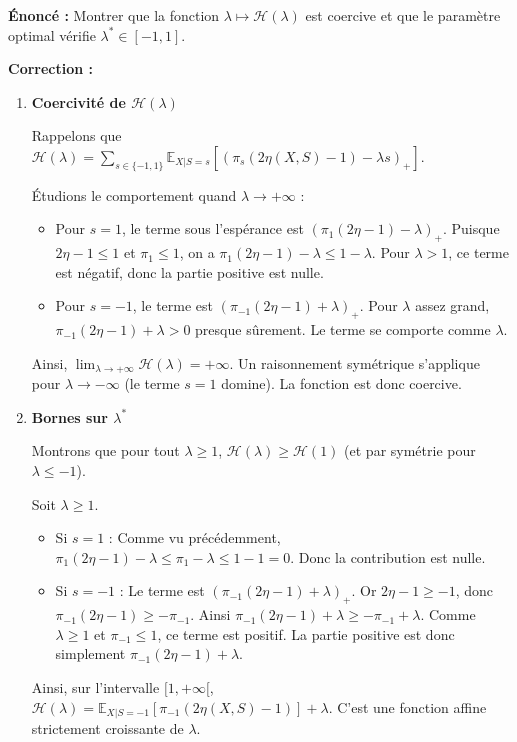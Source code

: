 \begin{exemple}
    \textbf{Énoncé :}
    Montrer que la fonction $\lambda \mapsto \mathcal{H}(\lambda)$ est coercive et que le paramètre optimal vérifie $\lambda^* \in [-1, 1]$.

    \medskip
    \textbf{Correction :}
    \begin{enumerate}
        \item \textbf{Coercivité de $\mathcal{H}(\lambda)$}
        
        Rappelons que $\mathcal{H}(\lambda) = \sum_{s \in \{-1, 1\}} \mathbb{E}_{X|S=s} \left[ (\pi_s (2\eta(X,S) - 1) - \lambda s)_+ \right]$.
        
        Étudions le comportement quand $\lambda \to +\infty$ :
        \begin{itemize}
            \item Pour $s = 1$, le terme sous l'espérance est $(\pi_{1}(2\eta - 1) - \lambda)_+$. Puisque $2\eta - 1 \le 1$ et $\pi_1 \le 1$, on a $\pi_1(2\eta - 1) - \lambda \le 1 - \lambda$. Pour $\lambda > 1$, ce terme est négatif, donc la partie positive est nulle.
            \item Pour $s = -1$, le terme est $(\pi_{-1}(2\eta - 1) + \lambda)_+$. Pour $\lambda$ assez grand, $\pi_{-1}(2\eta - 1) + \lambda > 0$ presque sûrement. Le terme se comporte comme $\lambda$.
        \end{itemize}
        Ainsi, $\lim_{\lambda \to +\infty} \mathcal{H}(\lambda) = +\infty$. Un raisonnement symétrique s'applique pour $\lambda \to -\infty$ (le terme $s=1$ domine). La fonction est donc coercive.
        
        \item \textbf{Bornes sur $\lambda^*$}
        
        Montrons que pour tout $\lambda \ge 1$, $\mathcal{H}(\lambda) \ge \mathcal{H}(1)$ (et par symétrie pour $\lambda \le -1$).
        
        Soit $\lambda \ge 1$.
        \begin{itemize}
            \item Si $s=1$ : Comme vu précédemment, $\pi_1(2\eta - 1) - \lambda \le \pi_1 - \lambda \le 1 - 1 = 0$. Donc la contribution est nulle.
            \item Si $s=-1$ : Le terme est $(\pi_{-1}(2\eta - 1) + \lambda)_+$.
            Or $2\eta - 1 \ge -1$, donc $\pi_{-1}(2\eta - 1) \ge -\pi_{-1}$.
            Ainsi $\pi_{-1}(2\eta - 1) + \lambda \ge -\pi_{-1} + \lambda$.
            Comme $\lambda \ge 1$ et $\pi_{-1} \le 1$, ce terme est positif.
            La partie positive est donc simplement $\pi_{-1}(2\eta - 1) + \lambda$.
        \end{itemize}
        Ainsi, sur l'intervalle $[1, +\infty[$, $\mathcal{H}(\lambda) = \mathbb{E}_{X|S=-1}[\pi_{-1}(2\eta(X,S) - 1)] + \lambda$.
        C'est une fonction affine strictement croissante de $\lambda$.
        

\end{enumerate}
\end{exemple}

